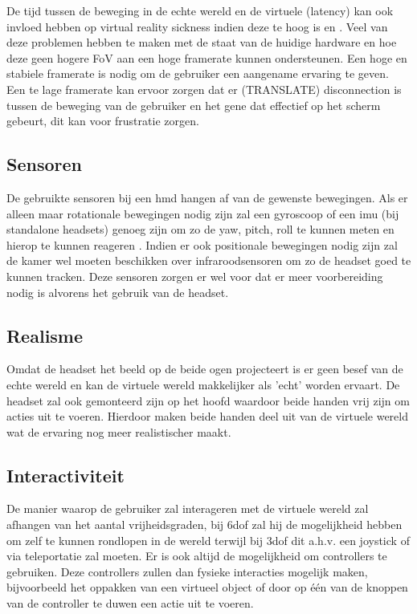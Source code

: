 De tijd tussen de beweging in de echte wereld en de virtuele (latency) kan ook invloed hebben op virtual reality sickness indien deze te hoog is \autocite{Elbamby2018} en \autocite{DiZio2000}. 
Veel van deze problemen hebben te maken met de staat van de huidige hardware en hoe deze geen hogere FoV aan een hoge framerate kunnen ondersteunen. Een hoge en stabiele framerate is nodig om de gebruiker een aangename ervaring te geven. Een te lage framerate kan ervoor zorgen dat er (TRANSLATE) disconnection is tussen de beweging van de gebruiker en het gene dat effectief op het scherm gebeurt, dit kan voor frustratie zorgen.

\subsection{Sensoren}
De gebruikte sensoren bij een \acrshort{hmd} hangen af van de gewenste bewegingen. Als er alleen maar rotationale bewegingen nodig zijn zal een gyroscoop of een \acrfull{imu} (bij standalone headsets) genoeg zijn om zo de yaw, pitch, roll te kunnen meten en hierop te kunnen reageren \autocite{LaValle2014}. Indien er ook positionale bewegingen nodig zijn zal de kamer wel moeten beschikken over infraroodsensoren om zo de headset goed te kunnen tracken. Deze sensoren zorgen er wel voor dat er meer voorbereiding nodig is alvorens het gebruik van de headset.

\subsection{Realisme}
Omdat de headset het beeld op de beide ogen projecteert is er geen besef van de echte wereld en kan de virtuele wereld makkelijker als 'echt' worden ervaart. De headset zal ook gemonteerd zijn op het hoofd waardoor beide handen vrij zijn om acties uit te voeren. Hierdoor maken beide handen deel uit van de virtuele wereld wat de ervaring nog meer realistischer maakt.
\subsection{Interactiviteit}
De manier waarop de gebruiker zal interageren met de virtuele wereld zal afhangen van het aantal vrijheidsgraden, bij \acrshort{6dof} zal hij de mogelijkheid hebben om zelf te kunnen rondlopen in de wereld terwijl bij \acrshort{3dof} dit a.h.v. een joystick of via teleportatie zal moeten. Er is ook altijd de mogelijkheid om controllers te gebruiken. Deze controllers zullen dan fysieke interacties mogelijk maken, bijvoorbeeld het oppakken van een virtueel object of door op één van de knoppen van de controller te duwen een actie uit te voeren.

